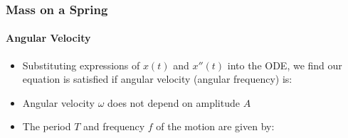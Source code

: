 \documentclass[12pt,compress,aspectratio=169]{beamer}
\begin{document}
\begin{frame}
  \frametitle{Mass on a Spring}
  \framesubtitle{Angular Velocity}
  \begin{itemize}
  \item Substituting expressions of $x(t)$ and $x''(t)$ into the ODE, we find
    our equation is satisfied if angular velocity (angular frequency) is:

  \item Angular velocity $\omega$ does not depend on amplitude $A$
  \item The period $T$ and frequency $f$ of the motion are given by:

  \end{itemize}
\end{frame}
\end{document}
